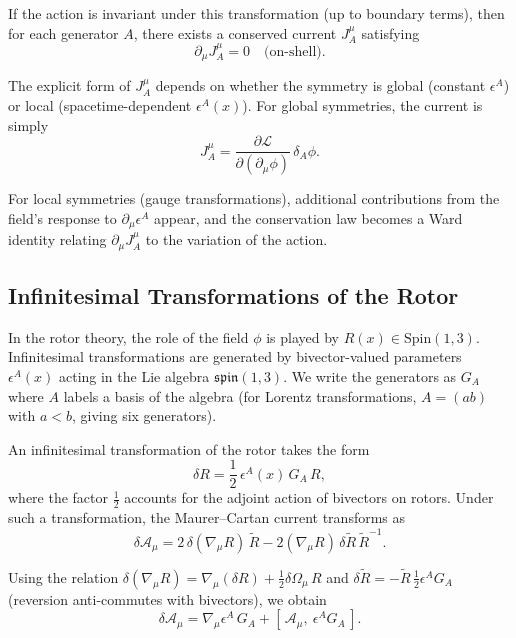 \documentclass[11pt,a4paper]{article}
\numberwithin{equation}{section}
\theoremstyle{plain}
\theoremstyle{definition}
\theoremstyle{remark}
\begin{document}
If the action is invariant under this transformation (up to boundary terms), then for each generator $A$, there exists a conserved current $J^\mu_A$ satisfying
\begin{equation}
\partial_\mu J^\mu_A = 0 \quad \text{(on-shell)}.
\end{equation}

The explicit form of $J^\mu_A$ depends on whether the symmetry is global (constant $\epsilon^A$) or local (spacetime-dependent $\epsilon^A(x)$). For global symmetries, the current is simply
\begin{equation}
J^\mu_A = \frac{\partial \mathcal{L}}{\partial (\partial_\mu \phi)} \, \delta_A \phi.
\end{equation}

For local symmetries (gauge transformations), additional contributions from the field's response to $\partial_\mu \epsilon^A$ appear, and the conservation law becomes a Ward identity relating $\partial_\mu J^\mu_A$ to the variation of the action.

\subsection{Infinitesimal Transformations of the Rotor}

In the rotor theory, the role of the field $\phi$ is played by $R(x) \in \mathrm{Spin}(1,3)$. Infinitesimal transformations are generated by bivector-valued parameters $\epsilon^A(x)$ acting in the Lie algebra $\mathfrak{spin}(1,3)$. We write the generators as $G_A$ where $A$ labels a basis of the algebra (for Lorentz transformations, $A = (ab)$ with $a < b$, giving six generators).

An infinitesimal transformation of the rotor takes the form
\begin{equation}
\delta R = \frac{1}{2}\,\epsilon^A(x)\,G_A\,R,
\label{eq:deltaR}
\end{equation}
where the factor $\frac{1}{2}$ accounts for the adjoint action of bivectors on rotors. Under such a transformation, the Maurer--Cartan current transforms as
\begin{equation}
\delta \mathcal{A}_\mu = 2\,\delta(\nabla_\mu R)\,\widetilde{R} - 2(\nabla_\mu R)\,\delta \widetilde{R}\,\widetilde{R}^{-1}.
\end{equation}

Using the relation $\delta(\nabla_\mu R) = \nabla_\mu(\delta R) + \frac{1}{2}\delta\Omega_\mu\, R$ and $\delta\widetilde{R} = -\widetilde{R}\,\frac{1}{2}\epsilon^A G_A$ (reversion anti-commutes with bivectors), we obtain
\begin{equation}
\delta \mathcal{A}_\mu = \nabla_\mu\epsilon^A\, G_A + [\,\mathcal{A}_\mu,\ \epsilon^A G_A\,].
\label{eq:deltaA}
\end{equation}
\end{document}
